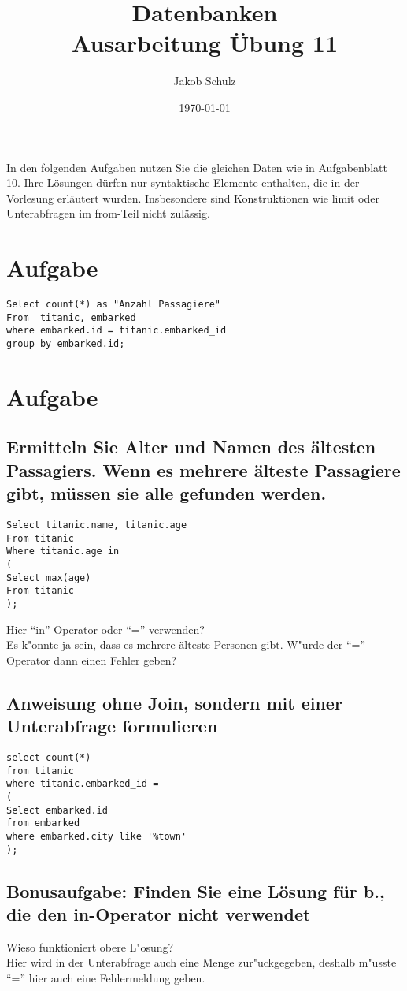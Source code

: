 \documentclass[a4paper, 11pt, titlepage]{article}
\begin{document}
\title{Datenbanken \\
Ausarbeitung \"Ubung 11}

\author{Jakob Schulz}

\date{\today}

\maketitle{\thispagestyle{plain}}
\noindent In den folgenden Aufgaben nutzen Sie die gleichen Daten wie in Aufgabenblatt 10. Ihre Lösungen 
dürfen nur syntaktische Elemente enthalten, die in der Vorlesung erläutert wurden. Insbesondere 
sind Konstruktionen wie limit oder Unterabfragen im from-Teil nicht zulässig.
\section{Aufgabe}
\begin{lstlisting}[style = sql]
Select count(*) as "Anzahl Passagiere"
From  titanic, embarked
where embarked.id = titanic.embarked_id
group by embarked.id;
\end{lstlisting}
\section{Aufgabe}
\subsection{Ermitteln Sie Alter und Namen des ältesten Passagiers. Wenn es mehrere älteste Passagiere 
gibt, müssen sie alle gefunden werden.}
\begin{lstlisting}[style = sql]
Select titanic.name, titanic.age
From titanic
Where titanic.age in 
(
Select max(age)
From titanic
);
\end{lstlisting}
Hier "`in"' Operator oder "`="' verwenden?\\
Es k"onnte ja sein, dass es mehrere älteste Personen gibt. W"urde der "`="'-Operator dann einen Fehler geben?
\subsection{Anweisung ohne Join, sondern mit einer Unterabfrage formulieren}
\begin{lstlisting}[style = sql]
select count(*)
from titanic 
where titanic.embarked_id = 
(
Select embarked.id
from embarked
where embarked.city like '%town'
);
\end{lstlisting}
\subsection{Bonusaufgabe: Finden Sie eine Lösung für b., die den in-Operator nicht verwendet}
Wieso funktioniert obere L"osung?\\
Hier wird in der Unterabfrage auch eine Menge zur"uckgegeben, deshalb m"usste "`="' hier auch eine Fehlermeldung geben.
\begin{lstlisting}[style = sql]

\end{lstlisting}
\end{document}
